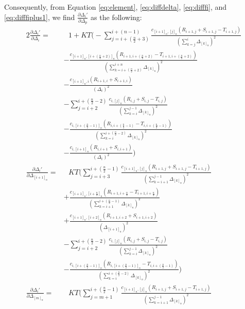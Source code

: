 Consequently, from Equation \ref{eq:element}, \ref{eq:diffdelta}, \ref{eq:difffi}, and \ref{eq:difffiplus1}, we find $\frac{\partial \Delta_i'}{\partial \Delta_p}$ as the following:
\begin{alignat}{2}
\frac{\partial \Delta_i'}{\partial \Delta_i} =& \text{ }1 + KT \Bigg(- \sum_{j= i + (\frac{n}{2}+ 3)}^{i+(n-1)}  \frac{c_{[i+1]_n,[j]_n}(R_{i+1,j} + S_{i+1,j} - T_{i+1,j})}{(\sum_{k=j}^{i}\Delta_{[k]_n})^2} \nonumber \\
 &- \frac{c_{[i+1]_n,[i+(\frac{n}{2}+2)]_n}(R_{i+1,i+(\frac{n}{2}+2)} - T_{i+1,i+(\frac{n}{2}+2)})}{(\sum_{k=i+(\frac{n}{2}+2)}^{i+n}\Delta_{[k]_n})^2} \nonumber \\
 &- \frac{c_{[i+1]_n,i}(R_{i+1,i} + S_{i+1,i})}{(\Delta_{i})^2} \nonumber \\
 &- \sum_{j= i + 2}^{i+(\frac{n}{2}-2)}  \frac{c_{i,[j]_n}(R_{i,j} + S_{i,j} - T_{i,j})}{(\sum_{k=i}^{j-1}\Delta_{[k]_n})^2} \nonumber \\
 &- \frac{c_{i,[i+(\frac{n}{2}-1)]_n}(R_{i,i+(\frac{n}{2}-1)} - T_{i,i+(\frac{n}{2}-1)})}{(\sum_{k=i}^{i+(\frac{n}{2}-2)}\Delta_{[k]_n})^2} \nonumber \\
 &- \frac{c_{i,[i+1]_n}(R_{i,i+1} + S_{i,i+1})}{(\Delta_i)^2} \Bigg) \nonumber \\
\frac{\partial \Delta_i'}{\partial \Delta_{[i+1]_n}} =& \text{ }KT \Bigg(\sum_{j= i+3}^{i+(\frac{n}{2}-1)}  \frac{c_{[i+1]_n,[j]_n}(R_{i+1,j} + S_{i+1,j} - T_{i+1,j})}{(\sum_{k=i+1}^{j-1}\Delta_{[k]_n})^2} \nonumber \\
  &+ \frac{c_{[i+1]_n,[i+\frac{n}{2}]_n}(R_{i+1,i+\frac{n}{2}} - T_{i+1,i+\frac{n}{2}})}{(\sum_{k=i+1}^{i+(\frac{n}{2}-1)}\Delta_{[k]_n})^2} \nonumber \\
  &+ \frac{c_{[i+1]_n,[i+2]_n}(R_{i+1,i+2} + S_{i+1,i+2})}{(\Delta_{[i+1]_n})^2} \nonumber \\
 &- \sum_{j= i + 2}^{i+(\frac{n}{2}-2)}  \frac{c_{i,[j]_n}(R_{i,j} + S_{i,j} - T_{i,j})}{(\sum_{k=i}^{j-1}\Delta_{[k]_n})^2} \nonumber \\
 &- \frac{c_{i,[i+(\frac{n}{2}-1)]_n}(R_{i,[i+(\frac{n}{2}-1)]_n} - T_{i,i+(\frac{n}{2}-1)})}{(\sum_{k=i}^{i+(\frac{n}{2}-2)}\Delta_{[k]_n})^2} \Bigg) \nonumber \\
\frac{\partial \Delta_i'}{\partial \Delta_{[m]_n}} =& \text{ }KT \Bigg(\sum_{j= m+1}^{i+(\frac{n}{2}-1)}  \frac{c_{[i+1]_n,[j]_n}(R_{i+1,j} + S_{i+1,j} - T_{i+1,j})}{(\sum_{k=i+1}^{j-1}\Delta_{[k]_n})^2} \nonumber \\

\end{alignat}
